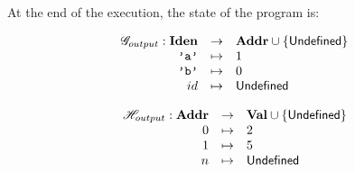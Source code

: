 %
%
%
%

At the end of the execution, the state of the program is:

\noindent
\begin{minipage}{.46\textwidth}
\[\begin{array}{rcl}
  \mathscr{G}_{output} : \mathbf{Iden} &\to& \mathbf{Addr} \cup \{\mathsf{Undefined}\} \\
  \texttt{'a'} &\mapsto& 1 \\
  \texttt{'b'} &\mapsto& 0 \\
  id &\mapsto& \mathsf{Undefined} \\
\end{array}\]
\end{minipage}%
\hfill%
\begin{minipage}{.46\textwidth}
\[\begin{array}{rcl}
  \mathscr{H}_{output} : \mathbf{Addr} &\to& \mathbf{Val} \cup \{\mathsf{Undefined}\} \\
  0 &\mapsto& 2 \\
  1 &\mapsto& 5 \\
  n &\mapsto& \mathsf{Undefined} \\
\end{array}\]
\end{minipage}%

